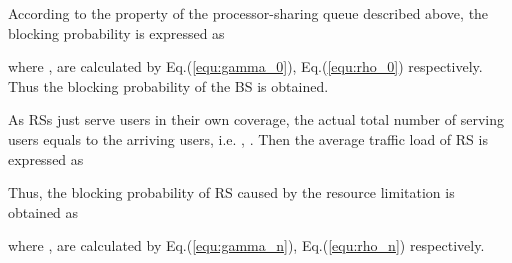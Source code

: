 \documentclass[conference]{IEEEtran}
\begin{document}
\begin{appendix}
 According to the property of the processor-sharing queue described above, the blocking probability is expressed as
 
 where ,  are calculated by Eq.(\ref{equ:gamma_0}), Eq.(\ref{equ:rho_0}) respectively. Thus the blocking probability of the BS is obtained.

 As RSs just serve users in their own coverage, the actual total number of serving users equals to the arriving users, i.e. , . Then the average traffic load of RS is expressed as
 

 Thus, the blocking probability of RS caused by the resource limitation  is obtained as
 
 where ,  are calculated by Eq.(\ref{equ:gamma_n}), Eq.(\ref{equ:rho_n}) respectively.

\end{appendix}
\end{document}
